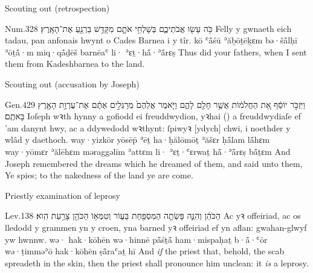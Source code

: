 \begin{frame}{\ex Scouting out (retrospection)}
	\begin{example}{Num.}{32}{8}{}{}
		\quoling
		{כֹּ֥ה עָשׂ֖וּ אֲבֹתֵיכֶ֑ם בְּשָׁלְחִ֥י אֹתָ֛ם מִקָּדֵ֥שׁ בַּרְנֵ֖עַ  אֶת־הָאָֽרֶץ׃}
		{Felly y gwnaeth eich tadau, pan anfonais hwynt o Cades Barnea i  y tîr.}
		{kō ʿå̄śū ʾăḇōṯēḵɛm bə·šå̄lḥī ʾōṯå̄·m miq·qå̄ḏēš barnēaʿ li· ʾɛṯ·hå̄·ʾå̄rɛṣ}
		{Thus did your fathers, when I sent them from Kadeshbarnea to  the land.}
	\end{example}
\end{frame}


\begin{frame}{\ex Scouting out (accusation by Joseph)}
	\begin{example}{Gen.}{42}{9}{}{}
		\quoling
		{וַיִּזְכֹּ֣ר יוֹסֵ֔ף אֵ֚ת הַחֲלֹמ֔וֹת אֲשֶׁ֥ר חָלַ֖ם לָהֶ֑ם וַיֹּ֤אמֶר אֲלֵהֶם֙ מְרַגְּלִ֣ים אַתֶּ֔ם  אֶת־עֶרְוַ֥ת הָאָ֖רֶץ בָּאתֶֽם׃}
		{Ioſeph wꝛth hynny a gofiodd ei freuddwydion, yꝛhai (\sic) a freuddwydiaſe ef ’am danynt hwy, ac a ddywedodd wꝛthynt: ſpiwyꝛ [ydych] chwi, i  noethder y wlâd y daethoch.}
		{way·yizkōr yōsēp̄ ʾēṯ ha·ḥălōmōṯ ʾăšɛr ḥå̄lam lå̄hɛm way·yōmɛr ʾălēhɛm məraggəlīm ʾattɛm li· ʾɛṯ·ʿɛrwaṯ hå̄·ʾå̄rɛṣ bå̄ṯɛm}
		{And Joseph remembered the dreams which he dreamed of them, and said unto them, Ye  spies; to  the nakedness of the land ye are come.}
	\end{example}
\end{frame}

\begin{frame}{\ex Priestly examination of leprosy}
	\begin{example}{Lev.}{13}{8}{}{}
		\quoling
		{ הַכֹּהֵ֔ן וְהִנֵּ֛ה פָּשְׂתָ֥ה הַמִּסְפַּ֖חַת בָּע֑וֹר וְטִמְּא֥וֹ הַכֹּהֵ֖ן צָרַ֥עַת הִֽוא׃}
		{Ac  yꝛ offeiriad, ac os lledodd y grammen yn y croen, yna barned yꝛ offeiriad ef yn aflan: gwahan-glwyf yw hwnnw.}
		{wə· hak·kōhēn wə·hinnē på̄śṯå̄ ham·mispaḥaṯ b·å̄·ʿōr wə·ṭimməʾō hak·kōhēn ṣå̄raʿaṯ hī}
		{And \emph{if} the priest  that, behold, the scab spreadeth in the skin, then the priest shall pronounce him unclean: it \emph{is} a leprosy.}
	\end{example}
\end{frame}





